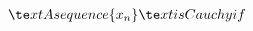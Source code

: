 \documentclass[preview]{standalone}
\begin{document}
\begin{align*}
\te x t{A sequence }\{ x _n\}\te x t{ is Cauchy if }
\end{align*}
\end{document}
